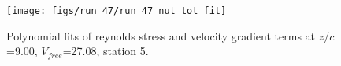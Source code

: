 \begin{figure}[H]
\centering
\texttt{[image: figs/run\_47/run\_47\_nut\_tot\_fit]}
\caption{Polynomial fits of reynolds stress and velocity gradient terms at $z/c$=9.00, $V_{free}$=27.08, station 5.}
\label{fig:run_47_nut_tot_fit}
\end{figure}


